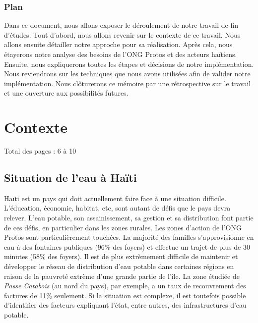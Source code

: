\documentclass{eplmastersthesis_FR}
\begin{document}

		\subsection*{Plan}

			Dans ce document, nous allons exposer le déroulement de notre travail de fin d'études. Tout d'abord, nous allons revenir sur le contexte de ce travail. Nous allons ensuite détailler notre approche pour sa réalisation. Après cela, nous étayerons notre analyse des besoins de l'ONG Protos et des acteurs haïtiens. Ensuite, nous expliquerons toutes les étapes et décisions de notre implémentation. Nous reviendrons sur les techniques que nous avons utilisées afin de valider notre implémentation. Nous clôturerons ce mémoire par une rétrospective sur le travail et une ouverture aux possibilités futures.


	\chapter{Contexte}

		Total des pages : 6 à 10

		\section{Situation de l'eau à Haïti}

			Haïti est un pays qui doit actuellement faire face à une situation difficile. L'éducation, économie, habitat, etc, sont autant de défis que le pays devra relever. L'eau potable, son assainissement, sa gestion et sa distribution font partie de ces défis, en particulier dans les zones rurales. Les zones d'action de l'ONG Protos sont particulièrement touchées. La majorité des familles s'approvisionne en eau à des fontaines publiques (96\% des foyers) et effectue un trajet de plus de 30 minutes (58\% des foyers). Il est de plus extrèmement difficile de maintenir et développer le réseau de distribution d'eau potable dans certaines régions en raison de la pauvreté extrème d'une grande partie de l'île. La zone étudiée de \emph{Passe Catabois} (au nord du pays), par exemple, a un taux de recouvrement des factures de 11\% seulement. Si la situation est complexe, il est toutefois possible d'identifier des facteurs expliquant l'état, entre autres, des infrastructures d'eau potable.
\end{document}
